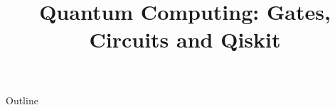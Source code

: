 \documentclass[xcolor=dvipsnames,compress,t,pdf,9pt]{beamer}
\title[\insertframenumber /\inserttotalframenumber]{Quantum Computing: Gates, Circuits and Qiskit}
\begin{document}
	\begin{frame}
	\titlepage
	\end{frame}

	\begin{frame}{Outline}
	    \tableofcontents
	\end{frame}

	
	
	
	
\end{document}
